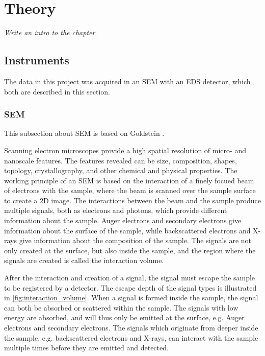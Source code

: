 \chapter{Theory}
\label{ch:theory}

\emph{Write an intro to the chapter}.

\section{Instruments}
\label{theory:instruments}

The data in this project was acquired in an SEM with an EDS detector, which both are described in this section.


\subsection{SEM}
\label{theory:instruments:sem}

This subsection about SEM is based on Goldstein \cite{goldstein_scanning_2018}.

Scanning electron microscopes provide a high spatial resolution of micro- and nanoscale features.
The features revealed can be size, composition, shapes, topology, crystallography, and other chemical and physical properties. %
The working principle of an SEM is based on the interaction of a finely focued beam of electrons with the sample, where the beam is scanned over the sample surface to create a 2D image.
The interactions between the beam and the sample produce multiple signals, both as electrons and photons, which provide different information about the sample.
Auger electrons and secondary electrons give information about the surface of the sample, while backscattered electrons and X-rays give information about the composition of the sample.
The signals are not only created at the surface, but also inside the sample, and the region where the signals are created is called the interaction volume.

After the interaction and creation of a signal, the signal must escape the sample to be registered by a detector.
The escape depth of the signal types is illustrated in \cref{fig:interaction_volume}.
When a signal is formed inside the sample, the signal can both be absorbed or scattered within the sample.
The signals with low energy are absorbed, and will thus only be emitted at the surface, e.g. Auger electrons and secondary electrons.
The signals which originate from deeper inside the sample, e.g. backscattered electrons and X-rays, can interact with the sample multiple times before they are emitted and detected.

